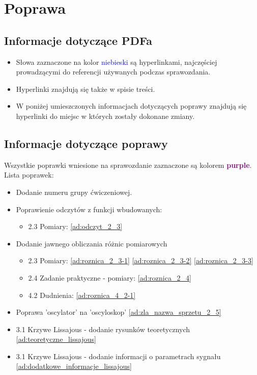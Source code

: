 \chapter{Poprawa}

\section{Informacje dotyczące PDFa}

\begin{itemize}
    \item Słowa zaznaczone na kolor \textcolor{blue}{niebieski} są hyperlinkami, najczęściej prowadzącymi do referencji używanych podczas sprawozdania.
    \item Hyperlinki znajdują się także w spisie treści.
    \item W poniżej umieszczonych informacjach dotyczących poprawy znajdują się hyperlinki do miejsc w których zostały dokonane zmiany.
\end{itemize}

\section{Informacje dotyczące poprawy}

Wszystkie poprawki wniesione na sprawozdanie zaznaczone są kolorem \textcolor{purple}{\textbf{purple}}. \\

Lista poprawek:
\begin{itemize}
    \item Dodanie numeru grupy ćwiczeniowej.
    \item Poprawienie odczytów z funkcji wbudowanych:
        \begin{itemize}
            \item 2.3 Pomiary: \ref{ad:odczyt_2_3}
        \end{itemize}
    \item Dodanie jawnego obliczania różnic pomiarowych
        \begin{itemize}
            \item 2.3 Pomiary: \ref{ad:roznica_2_3-1} \ref{ad:roznica_2_3-2} \ref{ad:roznica_2_3-3}
            \item 2.4 Zadanie praktyczne - pomiary: \ref{ad:roznica_2_4}
            \item 4.2 Dudnienia: \ref{ad:roznica_4_2-1}
        \end{itemize}
    \item Poprawa 'oscylator' na 'oscyloskop' \ref{ad:zla_nazwa_sprzetu_2_5}
    \item 3.1 Krzywe Lissajous - dodanie rysunków teoretycznych \ref{ad:teoretyczne_lissajous}
    \item 3.1 Krzywe Lissajous - dodanie informacji o parametrach sygnału \ref{ad:dodatkowe_informacje_lissajous}
\end{itemize}